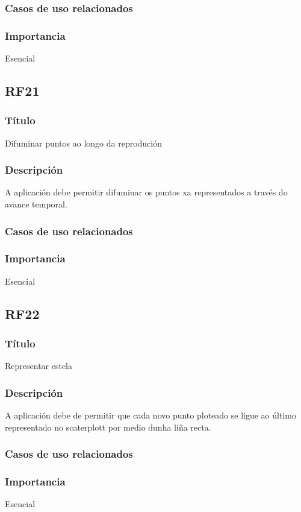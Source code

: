 \subsubsection{Casos de uso relacionados}
\subsubsection{Importancia}
Esencial

\subsection{RF21}
\subsubsection{Título}
Difuminar puntos ao longo da reprodución
\subsubsection{Descripción}
A aplicación debe permitir difuminar os puntos xa representados a través do avance temporal.
\subsubsection{Casos de uso relacionados}
\subsubsection{Importancia}
Esencial

\subsection{RF22}
\subsubsection{Título}
Representar estela
\subsubsection{Descripción}
A aplicación debe de permitir que cada novo punto ploteado se ligue ao último representado no scaterplott por medio dunha liña recta.
\subsubsection{Casos de uso relacionados}
\subsubsection{Importancia}
Esencial

